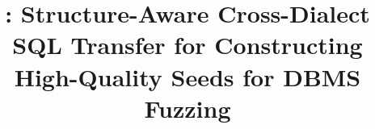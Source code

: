 \documentclass[sigconf,review,anonymous]{acmart}
\begin{document}
\title[\tool{}: Structure-Aware Cross-DBMS SQL Transfer]{\tool{}: Structure-Aware Cross-Dialect SQL Transfer for Constructing High-Quality Seeds for DBMS Fuzzing}



\end{document}
